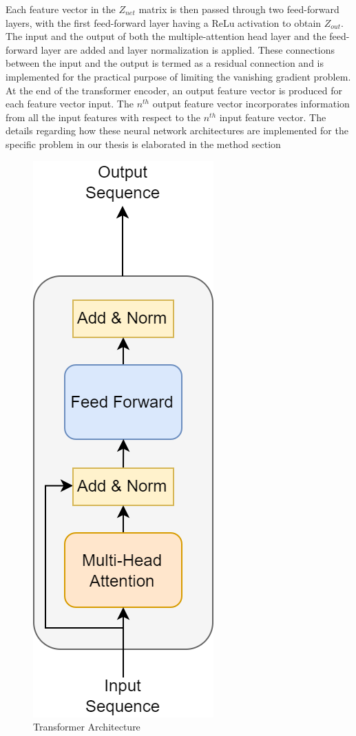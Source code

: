 \documentclass{article}
\begin{document}
Each feature vector in the $Z_{net}$ matrix is then passed through two feed-forward layers, with the first feed-forward layer having a ReLu activation to obtain $Z_{out}$. The input and the output of both the multiple-attention head layer and the feed-forward layer are added and layer normalization is applied. These connections between the input and the output is termed as a residual connection and is implemented for the practical purpose of limiting the vanishing gradient problem. At the end of the transformer encoder, an output feature vector is produced for each feature vector input. The $n^{th}$ output feature vector incorporates information from all the input features with respect to the $n^{th}$ input feature vector. The details regarding how these neural network architectures are implemented for the specific problem in our thesis is elaborated in the method section 

\begin{figure}[H]
\centering
\includegraphics[scale=0.4]{theory/transformer.png}
\caption{Transformer Architecture}
\label{fig:transformer}
\end{figure}
\end{document}
